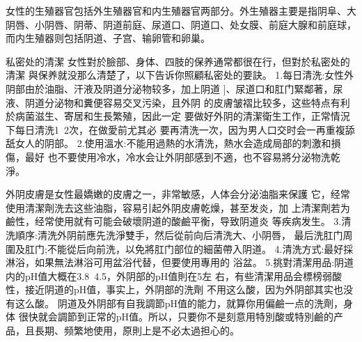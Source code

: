 \documentclass[12pt,UTF8]{ctexbook}
\begin{document}
女性的生殖器官包括外生殖器官和内生殖器官两部分。外生殖器主要是指阴阜、大阴唇、小阴唇、阴蒂、阴道前庭、尿道口、阴道口、处女膜、前庭大腺和前庭球，而内生殖器则包括阴道、子宫、输卵管和卵巢。

私密处的清潔
女性對於臉部、身体、四肢的保养通常都很在行，但對於私密处的清潔
與保养就没那么清楚了，以下告诉你照顧私密处的要訣。
1.每日清洗:女性外阴部由於油脂、汗液及阴道分泌物较多，加上阴道
]、尿道口和肛门緊鄰著，尿液、阴道分泌物和糞便容易交叉污染，且外阴
的皮膚皱褶比较多，这些特点有利於病菌滋生、寄居和生長繁殖，因此一定
要做好外阴的清潔衛生工作，正常情況下每日清洗1~2次，在做愛前尤其必
要再清洗一次，因为男人口交时会一再重複舔舐女人的阴部。
2.使用溫水:不能用過熱的水清洗，熱水会造成局部的刺激和損傷，最好
也不要使用冷水，冷水会让外阴部感到不適，也不容易將分泌物洗乾淨。

外阴皮膚是女性最嬌嫩的皮膚之一，非常敏感，人体会分泌油脂来保護
它，经常使用清潔劑洗去这些油脂，容易引起外阴皮膚乾燥，甚至发炎，加
上清潔劑若为鹼性，经常使用就有可能会破壞阴道的酸鹼平衡，导致阴道炎
等疾病发生。
3.清洗順序:清洗外阴前應先洗淨雙手，然后從前向后清洗大、小阴唇，
最后洗肛门周圍及肛门;不能從后向前洗，以免將肛门部位的細菌帶入阴道。
4.清洗方式:最好採淋浴，如果無法淋浴可用盆浴代替，但要使用專用的
浴盆。
5.挑對清潔用品:阴道内的pH值大概在3.8~4.5，外阴部的pH值則在5左
右，有些清潔用品会標榜弱酸性，接近阴道的pH值，事实上，外阴部的洗劑
不用这么酸，因为外阴部其实也没有这么酸。
阴道及外阴部有自我調節pH值的能力，就算你用偏鹼一点的洗劑，身体
很快就会調節到正常的pH值。所以，只要你不是刻意用特別酸或特別鹼的产
品，且長期、频繁地使用，原則上是不必太過担心的。
\end{document}
